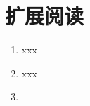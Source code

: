 \section{扩展阅读}\label{sec:扩展阅读07}
\begin{enumerate}
    \item xxx
    \item xxx
    \item \label{sub:7.11.3}\circletwo
\end{enumerate}